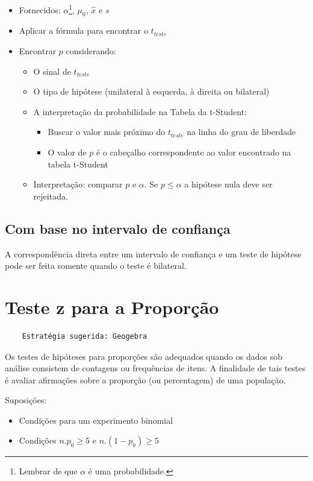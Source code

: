 \begin{itemize}
	\item Fornecidos: \(\alpha\)\footnote{Lembrar de que \(\alpha\) é uma probabilidade.}, \(\mu_0\), \(\hat{x}\) e \(s\)
	\item Aplicar a fórmula para encontrar o \(t_{teste}\)
	\item Encontrar \(p\) considerando:
	\begin{itemize}
		\item O sinal de \(t_{teste}\)
		\item O tipo de hipótese (unilateral à esquerda, à direita ou bilateral)
		\item A interpretação da probabilidade na Tabela da t-Student:
			\begin{itemize}
				\item Buscar o valor mais próximo do \(t_{teste}\) na linha do grau de liberdade
				\item O valor de \(p\) é o cabeçalho correspondente ao valor encontrado na tabela t-Student
			\end{itemize}
		\item Interpretação: comparar \(p\) e \(\alpha\). Se \(p \leq \alpha\) a hipótese nula deve ser rejeitada.
	\end{itemize}
\end{itemize}

\subsection{Com base no intervalo de confiança}

A correspondência direta entre um intervalo de confiança e um teste de hipótese pode ser feita somente quando o teste é bilateral.

\section{Teste z para a Proporção}

\begin{verbatim}
	Estratégia sugerida: Geogebra
\end{verbatim}

Os testes de hipóteses para proporções são adequados quando os dados sob análise consistem de contagens ou frequências de itens. A finalidade de tais testes é avaliar afirmações sobre a proporção (ou percentagem) de uma população.

Suposições:
\begin{itemize}
	\item Condições para um experimento binomial
	\item Condições \(n.p_0\geq5\) e \(n.(1-p_0)\geq5\)
\end{itemize}

